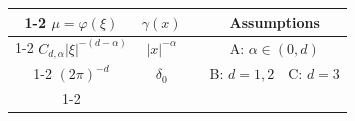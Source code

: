 \documentclass[9pt,table,xcolor=dvipsnames]{beamer}%
\begin{document}
\begin{frame}
    \begin{minipage}{0.2\textwidth}\phantom{a} \end{minipage}\hfill
    \begin{minipage}{0.78\textwidth}
    \begin{center}
    \renewcommand{\arraystretch}{1.2}
      \begin{tabular}{|c|c|c|c|c|}
 \cline{1-2} \cline{4-5}
 \textcolor{contrast_color_2}{$\mu=\varphi(\xi)$} & \textcolor{contrast_color_1}{$\gamma(x)$} &  & \multicolumn{2}{c|}{\textcolor{assumption_color}{Assumptions}}         \\ \cline{1-2} \cline{4-5}
        $C_{d,\alpha}|\xi|^{-(d-\alpha)}$                & $|x|^{-\alpha}$                           &  & \multicolumn{2}{c|}{\textcolor{assumption_color}{A}: $\alpha\in(0,d)$} \\ \cline{1-2} \cline{4-5}
 $(2\pi)^{-d}$                                    & $\delta_0$                                &  & \textcolor{assumption_color}{B}: $d=1,2$                                & \textcolor{assumption_color}{C}: $d=3$ \\ \cline{1-2} \cline{4-5}
      \end{tabular}
    \end{center}
    \end{minipage}
\end{frame}
\end{document}
